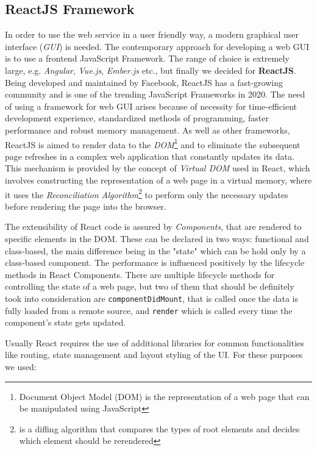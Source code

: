 \subsection{ReactJS Framework}
In order to use the web service in a user friendly way, a modern graphical user interface (\textit{GUI}) is needed. The contemporary approach for developing a web GUI is to use a frontend JavaScript Framework. The range of choice is extremely large, e.g. \textit{Angular}, \textit{Vue.js}, \textit{Ember.js} etc., but finally we decided for \textbf{ReactJS}. Being developed and maintained by Facebook, ReactJS has a fast-growing community and is one of the trending JavaScript Frameworks in 2020. The need of using a framework for web GUI arises because of necessity for time-efficient development experience, standardized methods of programming, faster performance and robust memory management. As well as other frameworks, ReactJS is aimed to render data to the \textit{DOM}\footnote{Document Object Model (DOM) is the representation of a web page that can be manipulated using JavaScript} and to eliminate the subsequent page refreshes in a complex web application that constantly updates its data. This mechanism is provided by the concept of \textit{Virtual DOM} used in React, which involves constructing the representation of a web page in a virtual memory, where it uses the \textit{Reconciliation Algorithm}\footnote{is a diffing algorithm that compares the types of root elements and decides which element should be rerendered} to perform only the necessary updates before rendering the page into the browser. \par
The extensibility of React code is assured by \textit{Components}, that are rendered to specific elements in the DOM. These can be declared in two ways: functional and class-based, the main difference being in the "state" which can be hold only by a class-based component. The performance is influenced positively by the lifecycle methods in React Components. There are multiple lifecycle methods for controlling the state of a web page, but two of them that should be definitely took into consideration are \texttt{componentDidMount}, that is called once the data is fully loaded from a remote source, and \texttt{render} which is called every time the component's state gets updated. \par
Usually React requires the use of additional libraries for common functionalities like routing, state management and layout styling of the UI. For these purposes we used:

